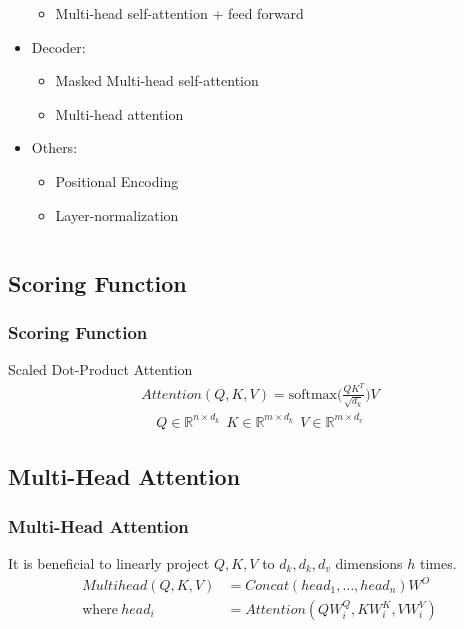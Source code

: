 \documentclass[]{beamer}
\newcommand{\bb}[1]{\mathbb{#1}}
\newcommand{\x}{\times}
\begin{document}
\begin{frame}
\begin{columns}
\begin{column}{0.5\textwidth}
\begin{itemize}
\begin{itemize}
                        \item Multi-head self-attention + feed forward
                    \end{itemize}
                \item Decoder: 
                    \begin{itemize}
                        \item Masked Multi-head self-attention
                        \item Multi-head attention
                    \end{itemize}
                \item Others:
                    \begin{itemize}
                        \item Positional Encoding
                        \item Layer-normalization
                    \end{itemize}
            \end{itemize}
                    
        \end{column}
    \end{columns}
\end{frame}

\subsection{Scoring Function}
\begin{frame}
    \frametitle{Scoring Function}
    Scaled Dot-Product Attention
    \begin{align*}
        Attention(Q, K, V) = \text{softmax} \Biggl(\frac{QK^T}{\sqrt{d_k}}\Biggr) V
    \end{align*}
    \begin{align*}
        Q \in \bb{R}^{n\x d_k}~~K \in \bb{R}^{m\x d_k}~~V\in \bb{R}^{m\x d_v}
    \end{align*}
\end{frame}

\subsection{Multi-Head Attention}
\begin{frame}
    \frametitle{Multi-Head Attention}
    It is beneficial to linearly project $Q, K, V$ to $d_k, d_k, d_v$ dimensions $h$ times.
    \begin{align*}
        Multihead(Q,K,V) &= Concat(head_1, \ldots, head_n) W^O \\
        \text{where}~head_i &= Attention(QW_i^Q, KW_i^K, VW_i^V)
    \end{align*}
\end{frame}
\end{document}
